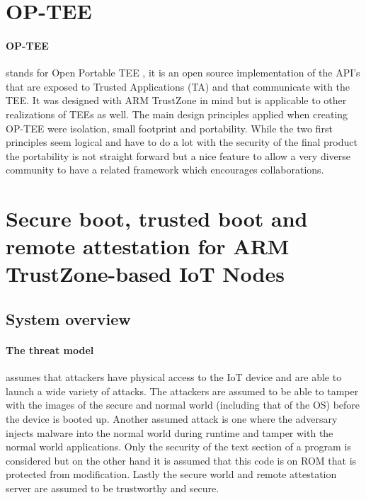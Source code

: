 \section{OP-TEE}

\paragraph*{OP-TEE}
stands for Open Portable TEE \cite{OP-TEE}, it is an open source implementation of the API's that are exposed to Trusted Applications (TA) and that communicate with the TEE. It was designed with ARM TrustZone in mind but is applicable to other realizations of TEEs as well. The main design principles applied when creating OP-TEE were isolation, small footprint and portability. While the two first principles seem logical and have to do a lot with the security of the final product the portability is not straight forward but a nice feature to allow a very diverse community to have a related framework which encourages collaborations.

\section{Secure boot, trusted boot and remote attestation for ARM TrustZone-based IoT Nodes \cite{LingZhen2021Sbtb}}

\subsection*{System overview}

\paragraph*{The threat model}
assumes that attackers have physical access to the IoT device and are able to launch a wide variety of attacks. The attackers are assumed to be able to tamper with the images of the secure and normal world (including that of the OS) before the device is booted up. Another assumed attack is one where the adversary injects malware into the normal world during runtime and tamper with the normal world applications. Only the security of the text section of a program is considered but on the other hand it is assumed that this code is on ROM that is protected from modification. Lastly the secure world and remote attestation server are assumed to be trustworthy and secure.

